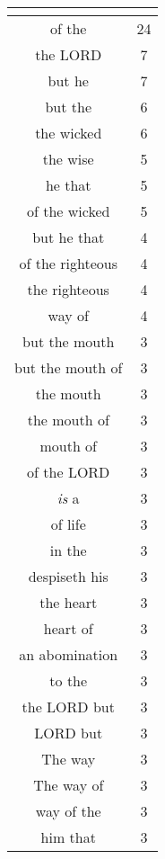 \begin{center}
\begin{longtable}{|c|c|}
\hline \multicolumn{2}{c}{{ }} \\ \hline
\endfoot 
of the & 24\\ \hline 
the LORD & 7\\ \hline 
but he & 7\\ \hline 
but the & 6\\ \hline 
the wicked & 6\\ \hline 
the wise & 5\\ \hline 
he that & 5\\ \hline 
of the wicked & 5\\ \hline 
but he that & 4\\ \hline 
of the righteous & 4\\ \hline 
the righteous & 4\\ \hline 
way of & 4\\ \hline 
but the mouth & 3\\ \hline 
but the mouth of & 3\\ \hline 
the mouth & 3\\ \hline 
the mouth of & 3\\ \hline 
mouth of & 3\\ \hline 
of the LORD & 3\\ \hline 
\emph{is} a & 3\\ \hline 
of life & 3\\ \hline 
in the & 3\\ \hline 
despiseth his & 3\\ \hline 
the heart & 3\\ \hline 
heart of & 3\\ \hline 
an abomination & 3\\ \hline 
to the & 3\\ \hline 
the LORD but & 3\\ \hline 
LORD but & 3\\ \hline 
The way & 3\\ \hline 
The way of & 3\\ \hline 
way of the & 3\\ \hline 
him that & 3\\ \hline 
\end{longtable}
\end{center}





